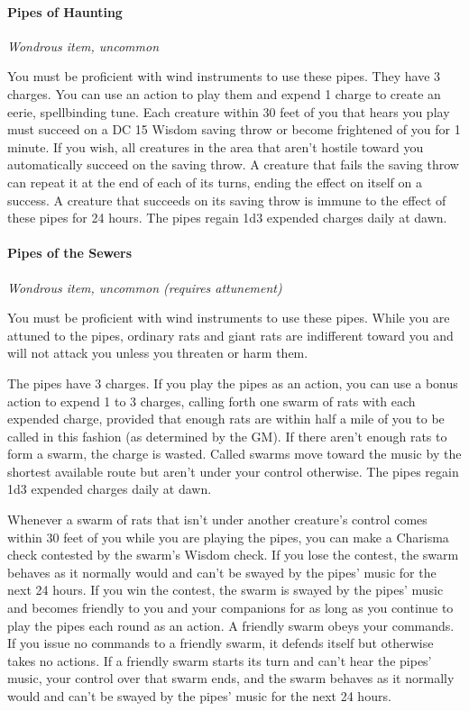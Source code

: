 \documentclass[
]{article}
\begin{document}
\hypertarget{pipes-of-haunting}{%
\paragraph{Pipes of Haunting}\label{pipes-of-haunting}}

\emph{Wondrous item, uncommon}

You must be proficient with wind instruments to use these pipes. They
have 3 charges. You can use an action to play them and expend 1 charge
to create an eerie, spellbinding tune. Each creature within 30 feet of
you that hears you play must succeed on a DC 15 Wisdom saving throw or
become frightened of you for 1 minute. If you wish, all creatures in the
area that aren't hostile toward you automatically succeed on the saving
throw. A creature that fails the saving throw can repeat it at the end
of each of its turns, ending the effect on itself on a success. A
creature that succeeds on its saving throw is immune to the effect of
these pipes for 24 hours. The pipes regain 1d3 expended charges daily at
dawn.

\hypertarget{pipes-of-the-sewers}{%
\paragraph{Pipes of the Sewers}\label{pipes-of-the-sewers}}

\emph{Wondrous item, uncommon (requires attunement)}

You must be proficient with wind instruments to use these pipes. While
you are attuned to the pipes, ordinary rats and giant rats are
indifferent toward you and will not attack you unless you threaten or
harm them.

The pipes have 3 charges. If you play the pipes as an action, you can
use a bonus action to expend 1 to 3 charges, calling forth one swarm of
rats with each expended charge, provided that enough rats are within
half a mile of you to be called in this fashion (as determined by the
GM). If there aren't enough rats to form a swarm, the charge is wasted.
Called swarms move toward the music by the shortest available route but
aren't under your control otherwise. The pipes regain 1d3 expended
charges daily at dawn.

Whenever a swarm of rats that isn't under another creature's control
comes within 30 feet of you while you are playing the pipes, you can
make a Charisma check contested by the swarm's Wisdom check. If you lose
the contest, the swarm behaves as it normally would and can't be swayed
by the pipes' music for the next 24 hours. If you win the contest, the
swarm is swayed by the pipes' music and becomes friendly to you and your
companions for as long as you continue to play the pipes each round as
an action. A friendly swarm obeys your commands. If you issue no
commands to a friendly swarm, it defends itself but otherwise takes no
actions. If a friendly swarm starts its turn and can't hear the pipes'
music, your control over that swarm ends, and the swarm behaves as it
normally would and can't be swayed by the pipes' music for the next 24
hours.
\end{document}
